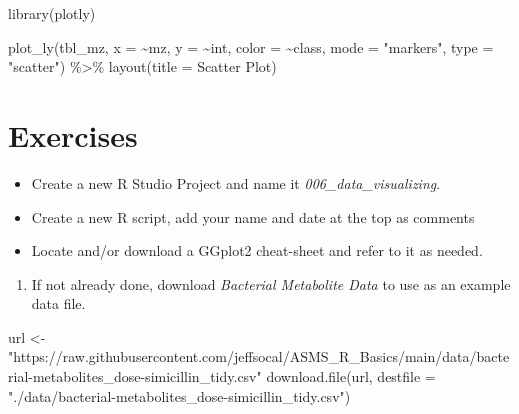 \documentclass[
]{book}
\newenvironment{Shaded}{\begin{snugshade}}{\end{snugshade}}
\newcommand{\AttributeTok}[1]{\textcolor[rgb]{0.77,0.63,0.00}{#1}}
\newcommand{\FunctionTok}[1]{\textcolor[rgb]{0.00,0.00,0.00}{#1}}
\newcommand{\NormalTok}[1]{#1}
\newcommand{\OtherTok}[1]{\textcolor[rgb]{0.56,0.35,0.01}{#1}}
\newcommand{\SpecialCharTok}[1]{\textcolor[rgb]{0.00,0.00,0.00}{#1}}
\newcommand{\StringTok}[1]{\textcolor[rgb]{0.31,0.60,0.02}{#1}}
\providecommand{\tightlist}{%
  \setlength{\itemsep}{0pt}\setlength{\parskip}{0pt}}
\begin{document}
\begin{Shaded}
\begin{Highlighting}[]
\FunctionTok{library}\NormalTok{(plotly)}
\end{Highlighting}
\end{Shaded}

\begin{Shaded}
\begin{Highlighting}[]
\FunctionTok{plot\_ly}\NormalTok{(tbl\_mz, }\AttributeTok{x =} \SpecialCharTok{\textasciitilde{}}\NormalTok{mz, }\AttributeTok{y =} \SpecialCharTok{\textasciitilde{}}\NormalTok{int, }\AttributeTok{color =} \SpecialCharTok{\textasciitilde{}}\NormalTok{class,}
        \AttributeTok{mode =} \StringTok{"markers"}\NormalTok{, }\AttributeTok{type =} \StringTok{"scatter"}\NormalTok{) }\SpecialCharTok{\%\textgreater{}\%} 
  \FunctionTok{layout}\NormalTok{(}\AttributeTok{title =} \StringTok{\textquotesingle{}Scatter Plot\textquotesingle{}}\NormalTok{)}
\end{Highlighting}
\end{Shaded}

\hypertarget{exercises-5}{%
\section*{Exercises}\label{exercises-5}}

\begin{itemize}
\tightlist
\item
  Create a new R Studio Project and name it \emph{006\_data\_visualizing}.
\item
  Create a new R script, add your name and date at the top as comments
\item
  Locate and/or download a GGplot2 cheat-sheet and refer to it as needed.
\end{itemize}

\begin{enumerate}
\def\labelenumi{\arabic{enumi}.}
\tightlist
\item
  If not already done, download \emph{Bacterial Metabolite Data} to use as an example data file.
\end{enumerate}

\begin{Shaded}
\begin{Highlighting}[]
\NormalTok{url }\OtherTok{\textless{}{-}} \StringTok{"https://raw.githubusercontent.com/jeffsocal/ASMS\_R\_Basics/main/data/bacterial{-}metabolites\_dose{-}simicillin\_tidy.csv"}
\FunctionTok{download.file}\NormalTok{(url, }\AttributeTok{destfile =} \StringTok{"./data/bacterial{-}metabolites\_dose{-}simicillin\_tidy.csv"}\NormalTok{)}
\end{Highlighting}
\end{Shaded}
\end{document}
